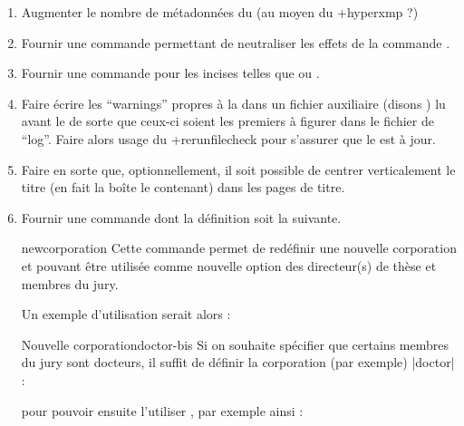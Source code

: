 \begin{enumerate}
\item Augmenter le nombre de métadonnées du  (au moyen du
  \Package+{hyperxmp} ?)
\item Fournir une commande  permettant de
  neutraliser les effets de la commande .
\item Fournir une commande  pour les incises telles que
   ou .
\item Faire écrire les \foreignquote{english}{warnings} propres à la \yatCl{}
  dans un fichier auxiliaire (disons ) lu avant le  de
  sorte que ceux-ci soient les premiers à figurer dans le fichier de
  \foreignquote{english}{log}. Faire alors usage du \Package*+{rerunfilecheck}
  pour s'assurer que le  est à jour.
\item Faire en sorte que, optionnellement, il soit possible de centrer
  verticalement le titre (en fait la boîte le contenant) dans les pages de
  titre.
\item Fournir une commande  dont la définition soit la
  suivante.
\begin{docCommand}{newcorporation}{}
  Cette commande permet de redéfinir une nouvelle corporation 
  et  pouvant être utilisée comme nouvelle option des
  directeur(s) de thèse et membres du jury.
\end{docCommand}

Un exemple d'utilisation serait alors :
\begin{dbexample}{Nouvelle corporation}{doctor-bis}
  Si on souhaite spécifier que certains membres du jury sont docteurs, il suffit
  de définir  la corporation (par exemple) |doctor| :
\begin{preamblecode}[title=Par exemple dans le \File{\configurationfile}]
\end{preamblecode}
  pour pouvoir ensuite l'utiliser , par
  exemple ainsi :
\begin{bodycode}
\end{bodycode}
\end{dbexample}

\end{enumerate}

